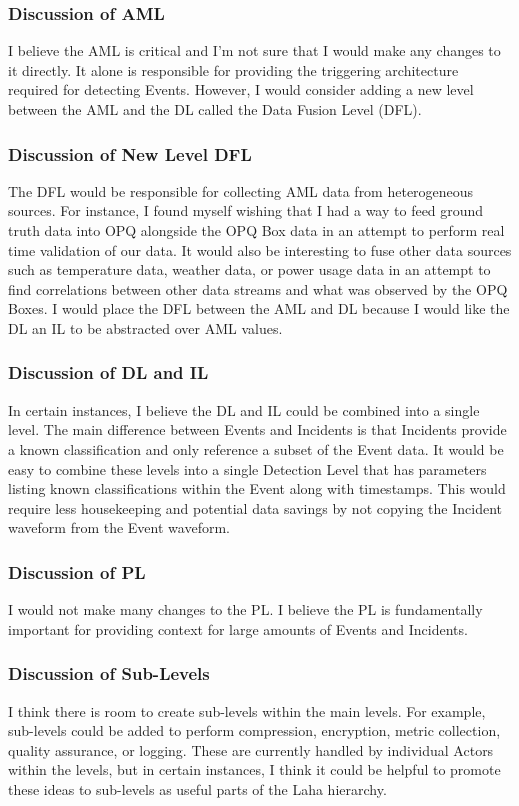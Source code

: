 \subsubsection{Discussion of AML}
I believe the AML is critical and I'm not sure that I would make any changes to it directly. It alone is responsible for providing the triggering architecture required for detecting Events. However, I would consider adding a new level between the AML and the DL called the Data Fusion Level (DFL).

\subsubsection{Discussion of New Level DFL}
The DFL would be responsible for collecting AML data from heterogeneous sources. For instance, I found myself wishing that I had a way to feed ground truth data into OPQ alongside the OPQ Box data in an attempt to perform real time validation of our data. It would also be interesting to fuse other data sources such as temperature data, weather data, or power usage data in an attempt to find correlations between other data streams and what was observed by the OPQ Boxes. I would place the DFL between the AML and DL because I would like the DL an IL to be abstracted over AML values.

\subsubsection{Discussion of DL and IL}
In certain instances, I believe the DL and IL could be combined into a single level. The main difference between Events and Incidents is that Incidents provide a known classification and only reference a subset of the Event data. It would be easy to combine these levels into a single Detection Level that has parameters listing known classifications within the Event along with timestamps. This would require less housekeeping and potential data savings by not copying the Incident waveform from the Event waveform.

\subsubsection{Discussion of PL}
I would not make many changes to the PL. I believe the PL is fundamentally important for providing context for large amounts of Events and Incidents.

\subsubsection{Discussion of Sub-Levels}
I think there is room to create sub-levels within the main levels. For example, sub-levels could be added to perform compression, encryption, metric collection, quality assurance, or logging. These are currently handled by individual Actors within the levels, but in certain instances, I think it could be helpful to promote these ideas to sub-levels as useful parts of the Laha hierarchy.

